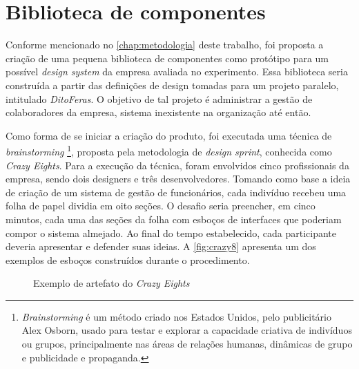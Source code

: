 
\chapter{Biblioteca de componentes}
\label{chap:bibComponentes}

Conforme mencionado no \autoref{chap:metodologia} deste trabalho, foi proposta a criação de uma pequena biblioteca de componentes como protótipo para um possível \textit{design system} da empresa avaliada no experimento. Essa biblioteca seria construída a partir das definições de design tomadas para um projeto paralelo, intitulado \textit{DitoFeras}. O objetivo de tal projeto é administrar a gestão de colaboradores da empresa, sistema inexistente na organização até então.

Como forma de se iniciar a criação do produto, foi executada uma técnica de \textit{brainstorming} \footnote{\textit{Brainstorming} é um método criado nos Estados Unidos, pelo publicitário Alex Osborn, usado para testar e explorar a capacidade criativa de indivíduos ou grupos, principalmente nas áreas de relações humanas, dinâmicas de grupo e publicidade e propaganda.}, proposta pela metodologia de \textit{design sprint}, conhecida como \textit{Crazy Eights}. Para a execução da técnica, foram envolvidos cinco profissionais da empresa, sendo dois designers e três desenvolvedores. Tomando como base a ideia de criação de um sistema de gestão de funcionários, cada indivíduo recebeu uma folha de papel dividia em oito seções. O desafio seria preencher, em cinco minutos, cada uma das seções da folha com esboços de interfaces que poderiam compor o sistema almejado. Ao final do tempo estabelecido, cada participante deveria apresentar e defender suas ideias. A \autoref{fig:crazy8} apresenta um dos exemplos de esboços construídos durante o procedimento.

\begin{figure}
  \caption{Exemplo de artefato do \textit{Crazy Eights}}
  \label{fig:crazy8}
\end{figure}

